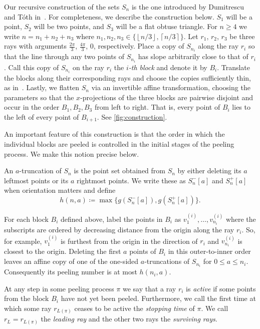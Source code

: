 \documentclass[11pt]{amsart}
\theoremstyle{definition}
\newcommand{\floor}[1]{\left\lfloor #1 \right\rfloor}
\newcommand{\ceil}[1]{\left\lceil #1 \right\rceil}
\begin{document}
Our recursive construction of the sets 
$S_n$ is the one introduced by Dumitrescu and T\'oth in~\cite{dumitrescuToth2025peeling}. 
For completeness, we describe the construction 
below. 
$S_1$ will be a point, $S_2$ will be two points, 
and $S_3$ will be a flat obtuse triangle. 
For $n\geq 4$ we write 
$n = n_1 + n_2 + n_3$ where $n_1,n_2,n_3\in \{\floor{n/3}, \ceil{n/3}\}$. 
Let $r_1$, $r_2$, $r_3$ be three rays with arguments $ \frac{2\pi}{3}$, $\frac{4\pi}{3}$, $0$, respectively.
Place a copy of $S_{n_i}$ along the ray 
$r_i$ so 
that the line through any two points of 
$S_{n_i}$ has slope arbitrarily close to that of $r_i$. 
Call this copy of  
$S_{n_i}$ on the ray $r_i$ the \emph{$i$-th block} 
and denote it by 
$B_i$.
Translate the blocks along their corresponding rays and choose the copies sufficiently thin, as in~\cite{dumitrescuToth2025peeling,simon2026further}. Lastly, we flatten $S_n$ 
via an invertible 
affine transformation, choosing the parameters so that the $x$-projections of the three blocks 
are pairwise disjoint and occur in the order $B_1,B_2,B_3$ from left to right. That is, every point of $B_i$ lies to the left of every point of $B_{i+1}$. See \cref{fig:construction}.
\par 
An important feature of this construction 
is that the order in which the individual 
blocks 
are peeled is controlled in the initial 
stages of the peeling process. We 
make this notion precise below. 
\par 
An $a$-truncation of $S_n$ is the point set obtained from $S_n$ by either deleting its $a$ leftmost points or its $a$ rightmost points. We write these as $S_n^-[a]$ and $S_n^+[a]$ when orientation matters and define \begin{equation*}
    h(n,a)\coloneqq \max \{g(S_n^-[a]), g(S_n^+[a])\}.
\end{equation*}

For each block $B_i$ defined above, label the 
points in $B_i$ as 
$v_1^{(i)},\dots, v_{n_i}^{(i)}$ where the subscripts 
are ordered by decreasing distance from the origin 
along the ray $r_i$. So, for example, $v_1^{(i)}$ is 
furthest from the origin in the direction of 
$r_i$ and $v_{n_i}^{(i)}$ is closest to 
the origin. Deleting the first $a$ points of $B_i$ in this outer-to-inner order leaves an affine copy of one of the one-sided $a$-truncations of $S_{n_i}$ for $0\le a \le n_i$. Consequently its peeling number is at most $h(n_i,a)$.
\par 
At any step in some peeling process $\pi$ we say that a 
ray $r_i$ is \emph{active} if some points 
from the block $B_i$ have not yet been peeled. 
Furthermore, we call the first time at which some ray $r_{L(\pi)}$ ceases to be active the \emph{stopping time} of $\pi$.  We call $r_L = r_{L(\pi)}$ the \emph{leading ray} and the other two rays the \emph{surviving rays}.
\end{document}
